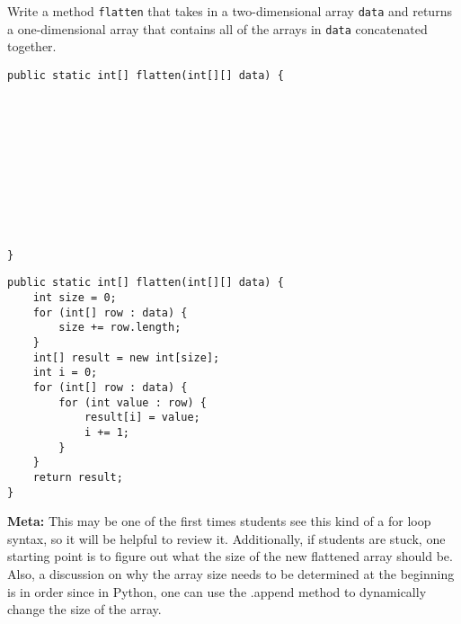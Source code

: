\question Write a method \texttt{flatten} that takes in a two-dimensional array \texttt{data} and returns a one-dimensional array that contains all of the arrays in \texttt{data} concatenated together.

\ifprintanswers\else
\begin{lstlisting}
public static int[] flatten(int[][] data) {











}
\end{lstlisting}
\fi

\begin{solution}
\begin{lstlisting}
public static int[] flatten(int[][] data) {
    int size = 0;
    for (int[] row : data) {
        size += row.length;
    }
    int[] result = new int[size];
    int i = 0;
    for (int[] row : data) {
        for (int value : row) {
            result[i] = value;
            i += 1;
        }
    }
    return result;
}
\end{lstlisting}
\textbf{Meta:} This may be one of the first times students see this kind of a for loop syntax, so it will be helpful to review it. Additionally, if students are stuck, one starting point is to figure out what the size of the new flattened array should be. Also, a discussion on why the array size needs to be determined at the beginning is in order since in Python, one can use the .append method to dynamically change the size of the array.
\end{solution}